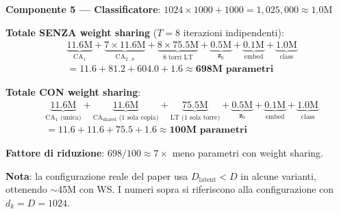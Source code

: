 \documentclass[12pt,a4paper]{article}
\begin{document}
\begin{examplebox}
\textbf{Componente 5 --- Classificatore}: $1024 \times 1000 + 1000 = 1{,}025{,}000 \approx 1.0$M

\medskip

\textbf{Totale SENZA weight sharing} ($T = 8$ iterazioni indipendenti):
\begin{align*}
&\underbrace{11.6\text{M}}_{\text{CA}_1} + \underbrace{7 \times 11.6\text{M}}_{\text{CA}_{2\ldots 8}} + \underbrace{8 \times 75.5\text{M}}_{\text{8 torri LT}} + \underbrace{0.5\text{M}}_{\mathbf{z}_0} + \underbrace{0.1\text{M}}_{\text{embed}} + \underbrace{1.0\text{M}}_{\text{class}} \\
&= 11.6 + 81.2 + 604.0 + 1.6 \approx \textbf{698M parametri}
\end{align*}

\textbf{Totale CON weight sharing}:
\begin{align*}
&\underbrace{11.6\text{M}}_{\text{CA}_1\text{ (unica)}} + \underbrace{11.6\text{M}}_{\text{CA}_{\text{shared}}\text{ (1 sola copia)}} + \underbrace{75.5\text{M}}_{\text{LT (1 sola torre)}} + \underbrace{0.5\text{M}}_{\mathbf{z}_0} + \underbrace{0.1\text{M}}_{\text{embed}} + \underbrace{1.0\text{M}}_{\text{class}} \\
&= 11.6 + 11.6 + 75.5 + 1.6 \approx \textbf{100M parametri}
\end{align*}

\textbf{Fattore di riduzione}: $698 / 100 \approx 7\times$ meno parametri con weight sharing.

\textbf{Nota}: la configurazione reale del paper usa $D_{\text{latent}} < D$ in alcune varianti, ottenendo $\sim$45M con WS. I numeri sopra si riferiscono alla configurazione con $d_k = D = 1024$.
\end{examplebox}
\end{document}
